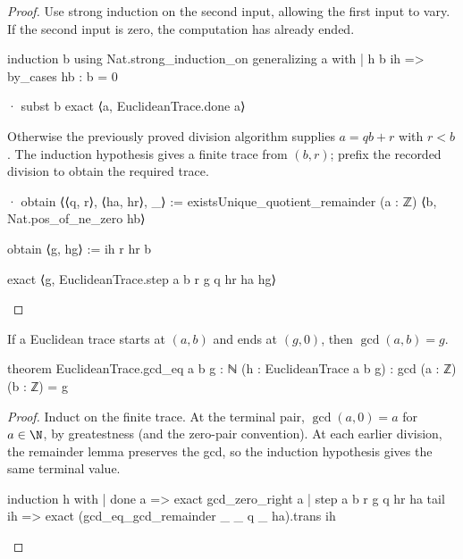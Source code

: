 \begin{proof}

  Use strong induction on the second input, allowing the first input to vary. If the second input is zero, the computation has already ended.

  \begin{lean}
    induction b using Nat.strong_induction_on generalizing a with
    | h b ih =>
      by_cases hb : b = 0

      · subst b
        exact ⟨a, EuclideanTrace.done a⟩
  \end{lean}

  Otherwise the previously proved division algorithm supplies $a=qb+r$ with $r<b$. The induction hypothesis gives a finite trace from $(b,r)$; prefix the recorded division to obtain the required trace.

  \begin{lean}
    · obtain ⟨⟨q, r⟩, ⟨ha, hr⟩, _⟩ :=
        existsUnique_quotient_remainder (a : ℤ) ⟨b, Nat.pos_of_ne_zero hb⟩

      obtain ⟨g, hg⟩ := ih r hr b

      exact ⟨g, EuclideanTrace.step a b r g q hr ha hg⟩
  \end{lean}

\end{proof}

\begin{theorem} \label{nt:thm:euclidean-correctness}
  If a Euclidean trace starts at $(a,b)$ and ends at $(g,0)$, then $\gcd(a,b)=g$.

  \begin{lean}
    theorem EuclideanTrace.gcd_eq {a b g : ℕ} (h : EuclideanTrace a b g) :
        gcd (a : ℤ) (b : ℤ) = g
  \end{lean}
\end{theorem}

\begin{proof}

  Induct on the finite trace. At the terminal pair, $\gcd(a,0)=a$ for $a\in\N$, by greatestness (and the zero-pair convention). At each earlier division, the remainder lemma preserves the gcd, so the induction hypothesis gives the same terminal value.

  \begin{lean}
    induction h with
    | done a => exact gcd_zero_right a
    | step a b r g q hr ha tail ih =>
      exact (gcd_eq_gcd_remainder _ _ q _ ha).trans ih
  \end{lean}

\end{proof}

